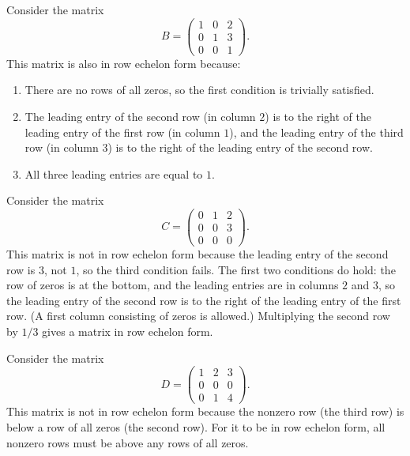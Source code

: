 \begin{example}\label{L1-ex:refB}
    Consider the matrix
    \[B = \begin{pmatrix}
        1 & 0 & 2 \\
        0 & 1 & 3 \\
        0 & 0 & 1
    \end{pmatrix}.\]
    This matrix is also in row echelon form because:
    \begin{enumerate}
        \item There are no rows of all zeros, so the first condition is trivially satisfied.
        \item The leading entry of the second row (in column $2$) is to the right of the leading entry of the first row (in column $1$), and the leading entry of the third row (in column $3$) is to the right of the leading entry of the second row.
        \item All three leading entries are equal to $1$.
    \end{enumerate}
\end{example}

\begin{example}
    Consider the matrix
    \[C = \begin{pmatrix}
        0 & 1 & 2 \\
        0 & 0 & 3 \\
        0 & 0 & 0
    \end{pmatrix}.\]
    This matrix is not in row echelon form because the leading entry of the second row is $3$, not $1$, so the third condition fails. The first two conditions do hold: the row of zeros is at the bottom, and the leading entries are in columns $2$ and $3$, so the leading entry of the second row is to the right of the leading entry of the first row. (A first column consisting of zeros is allowed.) Multiplying the second row by $1/3$ gives a matrix in row echelon form.
\end{example}

\begin{example}
    Consider the matrix
    \[D = \begin{pmatrix}
        1 & 2 & 3 \\
        0 & 0 & 0 \\
        0 & 1 & 4
    \end{pmatrix}.\]
    This matrix is not in row echelon form because the nonzero row (the third row) is below a row of all zeros (the second row). For it to be in row echelon form, all nonzero rows must be above any rows of all zeros.
\end{example}


